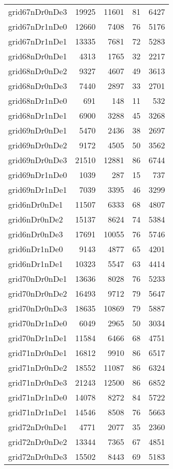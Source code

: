 \begin{longtable}{lrrrr}
grid67nDr0nDe3 & 19925 & 11601 & 81 & 6427 \\
grid67nDr1nDe0 & 12660 & 7408 & 76 & 5176 \\
grid67nDr1nDe1 & 13335 & 7681 & 72 & 5283 \\
grid68nDr0nDe1 & 4313 & 1765 & 32 & 2217 \\
grid68nDr0nDe2 & 9327 & 4607 & 49 & 3613 \\
grid68nDr0nDe3 & 7440 & 2897 & 33 & 2701 \\
grid68nDr1nDe0 & 691 & 148 & 11 & 532 \\
grid68nDr1nDe1 & 6900 & 3288 & 45 & 3268 \\
grid69nDr0nDe1 & 5470 & 2436 & 38 & 2697 \\
grid69nDr0nDe2 & 9172 & 4505 & 50 & 3562 \\
grid69nDr0nDe3 & 21510 & 12881 & 86 & 6744 \\
grid69nDr1nDe0 & 1039 & 287 & 15 & 737 \\
grid69nDr1nDe1 & 7039 & 3395 & 46 & 3299 \\
grid6nDr0nDe1 & 11507 & 6333 & 68 & 4807 \\
grid6nDr0nDe2 & 15137 & 8624 & 74 & 5384 \\
grid6nDr0nDe3 & 17691 & 10055 & 76 & 5746 \\
grid6nDr1nDe0 & 9143 & 4877 & 65 & 4201 \\
grid6nDr1nDe1 & 10323 & 5547 & 63 & 4414 \\
grid70nDr0nDe1 & 13636 & 8028 & 76 & 5233 \\
grid70nDr0nDe2 & 16493 & 9712 & 79 & 5647 \\
grid70nDr0nDe3 & 18635 & 10869 & 79 & 5887 \\
grid70nDr1nDe0 & 6049 & 2965 & 50 & 3034 \\
grid70nDr1nDe1 & 11584 & 6466 & 68 & 4751 \\
grid71nDr0nDe1 & 16812 & 9910 & 86 & 6517 \\
grid71nDr0nDe2 & 18552 & 11087 & 86 & 6324 \\
grid71nDr0nDe3 & 21243 & 12500 & 86 & 6852 \\
grid71nDr1nDe0 & 14078 & 8272 & 84 & 5722 \\
grid71nDr1nDe1 & 14546 & 8508 & 76 & 5663 \\
grid72nDr0nDe1 & 4771 & 2077 & 35 & 2360 \\
grid72nDr0nDe2 & 13344 & 7365 & 67 & 4851 \\
grid72nDr0nDe3 & 15502 & 8443 & 69 & 5183 \\

\end{longtable}
